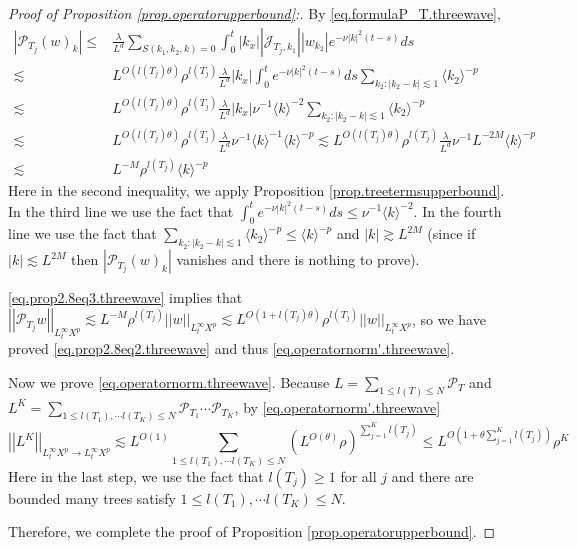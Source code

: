 \begin{proof}[Proof of Proposition \ref{prop.operatorupperbound}:]
By \eqref{eq.formulaP_T.threewave},
\begin{equation}\label{eq.prop2.8eq3.threewave}
\begin{split}
    |\mathcal{P}_{T_j}(w)_k|\le &\frac{\lambda}{L^{d}} \sum\limits_{S(k_1,k_2,k)=0}\int^{t}_0|k_{x}||\mathcal{J}_{T_j,k_1}| |w_{k_2}|e^{- \nu|k|^2(t-s)} ds
    \\
    \lesssim& L^{O(l(T_j)\theta)} \rho^{l(T_j)}\frac{\lambda}{L^{d}}|k_{x}| \int^{t}_0e^{- \nu|k|^2(t-s)} ds \sum_{k_2:|k_2-k|\lesssim 1} \langle k_2\rangle^{-p} 
    \\
    \lesssim& L^{O(l(T_j)\theta)} \rho^{l(T_j)}\frac{\lambda}{L^{d}} |k_{x}| \nu^{-1} \langle k\rangle^{-2} \sum_{k_2:|k_2-k|\lesssim 1} \langle k_2\rangle^{-p} 
    \\
    \lesssim& L^{O(l(T_j)\theta)} \rho^{l(T_j)}\frac{\lambda}{L^{d}} \nu^{-1} \langle k\rangle^{-1}  \langle k\rangle^{-p} \lesssim L^{O(l(T_j)\theta)} \rho^{l(T_j)}\frac{\lambda}{L^{d}} \nu^{-1} L^{-2M}  \langle k\rangle^{-p} 
    \\
    \lesssim& L^{-M} \rho^{l(T_j)} \langle k\rangle^{-p}
\end{split}
\end{equation} 
Here in the second inequality, we apply Proposition \ref{prop.treetermsupperbound}. In the third line we use the fact that $\int^{t}_0e^{- \nu|k|^2(t-s)} ds\le \nu^{-1} \langle k\rangle^{-2}$. In the fourth line we use the fact that $\sum_{k_2:|k_2-k|\lesssim 1} \langle k_2\rangle^{-p}\le \langle k\rangle^{-p}$ and $|k|\gtrsim L^{2M}$ (since if $|k|\lesssim L^{2M}$ then $|\mathcal{P}_{T_j}(w)_k|$ vanishes and there is nothing to prove).

\eqref{eq.prop2.8eq3.threewave} implies that $ \left|\left|\mathcal{P}_{T_j}w\right|\right|_{L_t^{\infty}X^p}\lesssim L^{-M} \rho^{l(T_j)} \left|\left|w\right|\right|_{L_t^{\infty}X^p}\lesssim L^{O(1+l(T_j)\theta)} \rho^{l(T_j)} \left|\left|w\right|\right|_{L_t^{\infty}X^p}$, so we have proved \eqref{eq.prop2.8eq2.threewave} and thus \eqref{eq.operatornorm'.threewave}.

Now we prove \eqref{eq.operatornorm.threewave}. Because $L=\sum_{1\le l(T)\le N} \mathcal{P}_{T}$ and $L^K=\sum_{1\le l(T_1),\cdots l(T_K)\le N} \mathcal{P}_{T_1}\cdots\mathcal{P}_{T_K}$, by \eqref{eq.operatornorm'.threewave} 
\begin{equation}
     \left|\left|L^K\right|\right|_{L_t^{\infty}X^p\rightarrow L_t^{\infty}X^p}\lesssim L^{O(1)} \sum_{1\le l(T_1),\cdots l(T_K)\le N} (L^{O(\theta)}\rho)^{\sum_{j=1}^K l(T_j)}\le L^{O\left(1+\theta \sum_{j=1}^K l(T_j)\right)} \rho^{K}
\end{equation}
Here in the last step, we use the fact that $l(T_j)\ge 1$ for all $j$ and there are bounded many trees satisfy $1\le l(T_1),\cdots l(T_K)\le N$.

Therefore, we complete the proof of Proposition \ref{prop.operatorupperbound}.
\end{proof}



